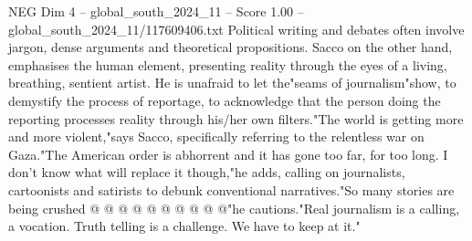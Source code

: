 \begin{textsample}{NEG Dim 4 – global\_south\_2024\_11 – Score 1.00 – global\_south\_2024\_11/117609406.txt}
Political writing and debates often involve jargon, dense arguments and theoretical propositions.
Sacco on the other hand, emphasises the human element, presenting reality through the eyes of a living, breathing, sentient artist.
He is unafraid to let the"seams of journalism"show, to demystify the process of reportage, to acknowledge that the person doing the reporting processes reality through his/her own filters."The world is getting more and more violent,"says Sacco, specifically referring to the relentless war on Gaza."The American order is abhorrent and it has gone too far, for too long.
I don't know what will replace it though,"he adds, calling on journalists, cartoonists and satirists to debunk conventional narratives."So many stories are being crushed @ @ @ @ @ @ @ @ @ @"he cautions."Real journalism is a calling, a vocation.
Truth telling is a challenge.
We have to keep at it."

\end{textsample}
